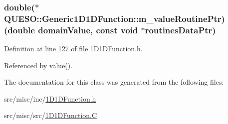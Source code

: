 \hypertarget{class_q_u_e_s_o_1_1_generic1_d1_d_function_a7b3fcf1c3e06132c5c7e5c3e1a87134c}{
\subsubsection[{m\-\_\-value\-Routine\-Ptr}]{\setlength{\rightskip}{0pt plus 5cm}double($\ast$ Q\-U\-E\-S\-O\-::\-Generic1\-D1\-D\-Function\-::m\-\_\-value\-Routine\-Ptr)(double domain\-Value, const void $\ast$routines\-Data\-Ptr)\hspace{0.3cm}{\ttfamily [protected]}}}\label{class_q_u_e_s_o_1_1_generic1_d1_d_function_a7b3fcf1c3e06132c5c7e5c3e1a87134c}


Definition at line 127 of file 1\-D1\-D\-Function.\-h.



Referenced by value().



The documentation for this class was generated from the following files\-:\begin{DoxyCompactItemize}
\item 
src/misc/inc/\hyperlink{1_d1_d_function_8h}{1\-D1\-D\-Function.\-h}\item 
src/misc/src/\hyperlink{1_d1_d_function_8_c}{1\-D1\-D\-Function.\-C}\end{DoxyCompactItemize}
